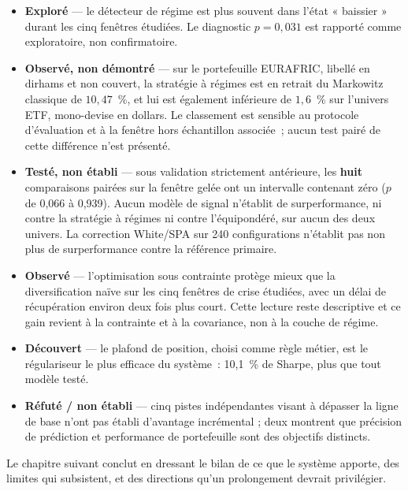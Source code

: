 \begin{itemize}
  \item \textbf{Exploré} — le détecteur de régime est plus souvent dans l'état
        « baissier » durant les cinq fenêtres étudiées. Le diagnostic $p = 0{,}031$
        est rapporté comme exploratoire, non confirmatoire.
  \item \textbf{Observé, non démontré} — sur le portefeuille EURAFRIC, libellé en
        dirhams et non couvert, la stratégie à régimes est en retrait du
        Markowitz classique de $10{,}47$~\%, et lui est également inférieure de
        $1{,}6$~\% sur l'univers ETF, mono-devise en dollars. Le classement est
        sensible au protocole d'évaluation et à la fenêtre hors échantillon
        associée~; aucun test pairé de cette différence n'est présenté.
  \item \textbf{Testé, non établi} — sous validation strictement antérieure, les
        \textbf{huit} comparaisons pairées sur la fenêtre gelée ont un intervalle
        contenant zéro ($p$ de 0,066 à 0,939). Aucun modèle de signal n'établit de
        surperformance, ni contre la stratégie à régimes ni contre l'équipondéré,
        sur aucun des deux univers. La correction White/SPA sur 240 configurations
        n'établit pas non plus de surperformance contre la référence primaire.
  \item \textbf{Observé} — l'optimisation sous contrainte protège mieux que la
        diversification naïve sur les cinq fenêtres de crise étudiées, avec un
        délai de récupération environ deux fois plus court. Cette lecture reste
        descriptive et ce gain revient à la contrainte et à la covariance, non à
        la couche de régime.
  \item \textbf{Découvert} — le plafond de position, choisi comme règle métier,
        est le régulariseur le plus efficace du système~: 10,1~\% de Sharpe, plus
        que tout modèle testé.
  \item \textbf{Réfuté / non établi} — cinq pistes indépendantes visant à
        dépasser la ligne de base n'ont pas établi d'avantage incrémental ; deux
        montrent que précision de prédiction et performance de portefeuille sont
        des objectifs distincts.
\end{itemize}

Le chapitre suivant conclut en dressant le bilan de ce que le système apporte,
des limites qui subsistent, et des directions qu'un prolongement devrait
privilégier.
